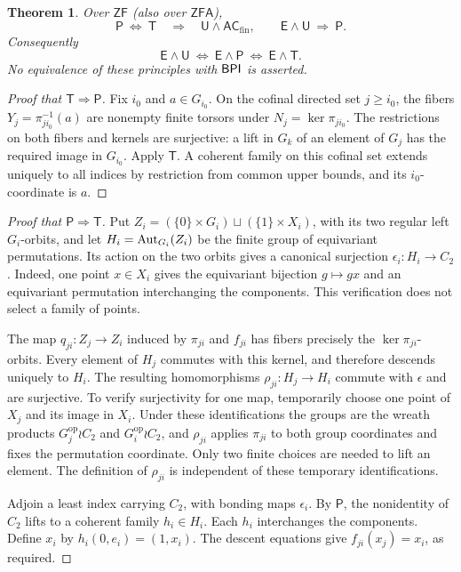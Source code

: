 \documentclass[11pt,a4paper]{article}
\newtheorem{theorem}{Theorem}[section]
\theoremstyle{definition}\newtheorem{definition}[theorem]{Definition}
\theoremstyle{remark}\newtheorem{remark}[theorem]{Remark}
\newcommand{\ZF}{\mathsf{ZF}}\newcommand{\ZFA}{\mathsf{ZFA}}
\newcommand{\E}{\mathsf E}\newcommand{\U}{\mathsf U}
\newcommand{\ACfin}{\mathsf{AC}_{\mathrm{fin}}}
\begin{document}
\begin{theorem}\label{thm:torsors}
Over $\ZF$ (also over $\ZFA$),
\[
\mathsf P\ \Longleftrightarrow\ \mathsf T
\quad\Longrightarrow\quad \U\wedge\ACfin,
\qquad
\E\wedge\U\ \Longrightarrow\ \mathsf P.
\]
Consequently
\[
\E\wedge\U\ \Longleftrightarrow\ \E\wedge\mathsf P
\ \Longleftrightarrow\ \E\wedge\mathsf T.
\]
No equivalence of these principles with $\mathsf{BPI}$ is asserted.
\end{theorem}
\begin{proof}[Proof that $\mathsf T\Rightarrow\mathsf P$]
Fix $i_0$ and $a\in G_{i_0}$. On the cofinal directed set $j\geq i_0$, the fibers $Y_j=\pi_{j i_0}^{-1}(a)$ are nonempty finite torsors under $N_j=\ker\pi_{j i_0}$. The restrictions on both fibers and kernels are surjective: a lift in $G_k$ of an element of $G_j$ has the required image in $G_{i_0}$. Apply $\mathsf T$. A coherent family on this cofinal set extends uniquely to all indices by restriction from common upper bounds, and its $i_0$-coordinate is $a$.
\end{proof}
\begin{proof}[Proof that $\mathsf P\Rightarrow\mathsf T$]
Put $Z_i=(\{0\}\times G_i)\sqcup(\{1\}\times X_i)$, with its two regular left $G_i$-orbits, and let $H_i=\operatorname{Aut}_{G_i}(Z_i)$ be the finite group of equivariant permutations. Its action on the two orbits gives a canonical surjection $\epsilon_i:H_i\to C_2$. Indeed, one point $x\in X_i$ gives the equivariant bijection $g\mapsto gx$ and an equivariant permutation interchanging the components. This verification does not select a family of points.

The map $q_{ji}:Z_j\to Z_i$ induced by $\pi_{ji}$ and $f_{ji}$ has fibers precisely the $\ker\pi_{ji}$-orbits. Every element of $H_j$ commutes with this kernel, and therefore descends uniquely to $H_i$. The resulting homomorphisms $\rho_{ji}:H_j\to H_i$ commute with $\epsilon$ and are surjective. To verify surjectivity for one map, temporarily choose one point of $X_j$ and its image in $X_i$. Under these identifications the groups are the wreath products $G_j^{\mathrm{op}}\wr C_2$ and $G_i^{\mathrm{op}}\wr C_2$, and $\rho_{ji}$ applies $\pi_{ji}$ to both group coordinates and fixes the permutation coordinate. Only two finite choices are needed to lift an element. The definition of $\rho_{ji}$ is independent of these temporary identifications.

Adjoin a least index carrying $C_2$, with bonding maps $\epsilon_i$. By $\mathsf P$, the nonidentity of $C_2$ lifts to a coherent family $h_i\in H_i$. Each $h_i$ interchanges the components. Define $x_i$ by $h_i(0,e_i)=(1,x_i)$. The descent equations give $f_{ji}(x_j)=x_i$, as required.
\end{proof}
\end{document}
